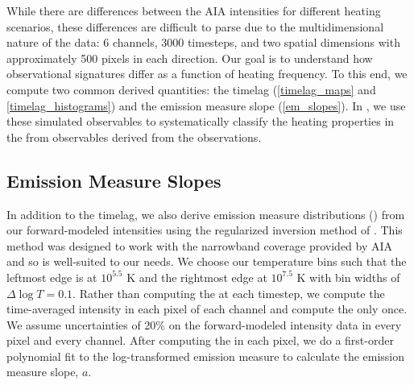 While there are differences between the AIA intensities for different heating scenarios, these differences are difficult to parse due to the multidimensional nature of the data: 6 channels, 3000 timesteps, and two spatial dimensions with approximately 500 pixels in each direction. Our goal is to understand how observational signatures differ as a function of heating frequency. To this end, we compute two common derived quantities: the timelag (\autoref{timelag_maps} and \autoref{timelag_histograms}) and the emission measure slope (\autoref{em_slopes}). In , we use these simulated observables to systematically classify the heating properties in the \AR{} from observables derived from the observations.

\subsection{Emission Measure Slopes}\label{em_slopes}

In addition to the timelag, we also derive emission measure distributions (\dem{}) from our forward-modeled intensities using the regularized inversion method of \citet{hannah_differential_2012}. This method was designed to work with the narrowband coverage provided by AIA and so is well-suited to our needs. We choose our temperature bins such that the leftmost edge is at $10^{5.5}$ K and the rightmost edge at $10^{7.5}$ K with bin widths of $\Delta\log T=0.1$. Rather than computing the \dem{} at each timestep, we compute the time-averaged intensity in each pixel of each channel and compute the \dem{} only once. We assume uncertainties of 20\% on the forward-modeled intensity data in every pixel and every channel. After computing the \dem{} in each pixel, we do a first-order polynomial fit to the log-transformed emission measure to calculate the emission measure slope, $a$.

